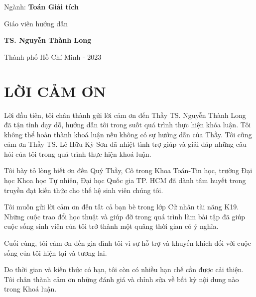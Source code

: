 \documentclass[12pt,a4paper]{article}
\theoremstyle{definition}
\theoremstyle{definition}
\begin{document}
\begin{center}
    {\fontsize{13}{1}\selectfont \qquad Ngành: \textbf{Toán Giải tích}} 
\end{center}
 


\vspace*{2.5cm}

\begin{center}
    {\fontsize{13}{1}\selectfont \qquad Giáo viên hướng dẫn}

    {\fontsize{13}{1}\selectfont \qquad \textbf{TS. Nguyễn Thành Long}}
\end{center}
 


\vfill

\begin{center}
{\fontsize{12}{1}\selectfont  Thành phố Hồ Chí Minh - 2023}
\end{center}
 

\vspace*{0.5cm}

\section*{LỜI CẢM ƠN}

Lời đầu tiên,
tôi chân thành gửi lời cảm ơn đến Thầy TS. Nguyễn Thành Long đã tận tình dạy dỗ, hướng dẫn tôi trong suốt quá trình thực hiện khóa luận. Tôi không thể hoàn thành khoá luận nếu không có sự hướng dẫn của Thầy. Tôi cũng cảm ơn Thầy TS. Lê Hữu Kỳ Sơn đã nhiệt tình trợ giúp và giải đáp những câu hỏi của tôi trong quá trình thực hiện khoá luận.

Tôi bày tỏ lòng biết ơn đến Quý Thầy, Cô trong Khoa Toán-Tin học, trường Đại học Khoa học Tự nhiên, Đại học Quốc gia TP. HCM đã dành tâm huyết trong truyền đạt kiến thức cho thế hệ sinh viên chúng tôi.

Tôi muốn gửi lời cảm ơn đến tất cả bạn bè trong lớp Cử nhân tài năng K19. Những cuộc trao đổi học thuật và giúp đỡ trong quá trình làm bài tập đã giúp cuộc sống sinh viên của tôi trở thành một quãng thời gian có ý nghĩa.

Cuối cùng, tôi cảm ơn đến gia đình tôi vì sự hỗ trợ và khuyến khích đối với cuộc sống của tôi hiện tại và tương lai.

Do thời gian và kiến thức có hạn, tôi còn có nhiều hạn chế cần được cải thiện. Tôi chân thành cảm ơn những đánh giá và chỉnh sửa về bất kỳ nội dung nào trong Khoá luận.
\newpage

\tableofcontents
\newpage
\end{document}
